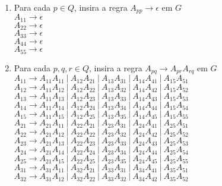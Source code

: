 \begin{enumerate}[label={\textbf{\arabic*.}}]
    \item Para cada $p \in Q$, insira a regra $A_{pp} \rightarrow \epsilon$ em $G$\\[2pt]
    $A_{11} \rightarrow \epsilon$\\
    $A_{22} \rightarrow \epsilon$\\
    $A_{33} \rightarrow \epsilon$\\
    $A_{44} \rightarrow \epsilon$\\
    $A_{55} \rightarrow \epsilon$
    
    \item Para cada $p, q, r \in Q$, insira a regra $A_{pq} \rightarrow A_{pr}A_{rq}$ em $G$\\[2pt]
    $A_{11} \rightarrow A_{11}A_{11}\ |\ A_{12}A_{21}\ |\ A_{13}A_{31}\ |\ A_{14}A_{41}\ |\ A_{15}A_{51}$\\
    $A_{12} \rightarrow A_{11}A_{12}\ |\ A_{12}A_{22}\ |\ A_{13}A_{32}\ |\ A_{14}A_{42}\ |\ A_{15}A_{52}$\\
    $A_{13} \rightarrow A_{11}A_{13}\ |\ A_{12}A_{23}\ |\ A_{13}A_{33}\ |\ A_{14}A_{43}\ |\ A_{15}A_{53}$\\
    $A_{14} \rightarrow A_{11}A_{14}\ |\ A_{12}A_{24}\ |\ A_{13}A_{34}\ |\ A_{14}A_{44}\ |\ A_{15}A_{54}$\\
    $A_{15} \rightarrow A_{11}A_{15}\ |\ A_{12}A_{25}\ |\ A_{13}A_{35}\ |\ A_{14}A_{45}\ |\ A_{15}A_{55}$\\[4pt]
    $A_{21} \rightarrow A_{21}A_{11}\ |\ A_{22}A_{21}\ |\ A_{23}A_{31}\ |\ A_{24}A_{41}\ |\ A_{25}A_{51}$\\
    $A_{22} \rightarrow A_{21}A_{12}\ |\ A_{22}A_{22}\ |\ A_{23}A_{32}\ |\ A_{24}A_{42}\ |\ A_{25}A_{52}$\\
    $A_{23} \rightarrow A_{21}A_{13}\ |\ A_{22}A_{23}\ |\ A_{23}A_{33}\ |\ A_{24}A_{43}\ |\ A_{25}A_{53}$\\
    $A_{24} \rightarrow A_{21}A_{14}\ |\ A_{22}A_{24}\ |\ A_{23}A_{34}\ |\ A_{24}A_{44}\ |\ A_{25}A_{54}$\\
    $A_{25} \rightarrow A_{21}A_{15}\ |\ A_{22}A_{25}\ |\ A_{23}A_{35}\ |\ A_{24}A_{45}\ |\ A_{25}A_{55}$\\[4pt]
    $A_{31} \rightarrow A_{31}A_{11}\ |\ A_{32}A_{21}\ |\ A_{33}A_{31}\ |\ A_{34}A_{41}\ |\ A_{35}A_{51}$\\
    $A_{32} \rightarrow A_{31}A_{12}\ |\ A_{32}A_{22}\ |\ A_{33}A_{32}\ |\ A_{34}A_{42}\ |\ A_{35}A_{52}$\\

\end{enumerate}

